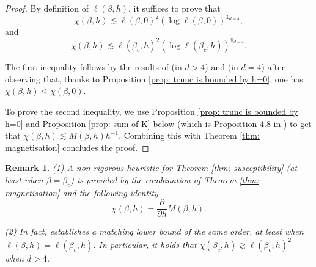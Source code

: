 \documentclass[10pt,a4paper]{amsart}
\numberwithin{equation}{section}
\newtheorem{Rem}[Thm]{Remark}
\begin{document}
\begin{proof} By definition of $\ell(\beta,h)$, it suffices to prove that 
\begin{equation}
\chi(\beta,h)\lesssim \ell(\beta,0)^2(\log \ell(\beta,0))^{\mathds{1}_{d=4}},
\end{equation} and 
\begin{equation}
\chi(\beta,h)\lesssim \ell(\beta_c,h)^2(\log \ell(\beta_c,h))^{\mathds{1}_{d=4}}.
\end{equation} 

The first inequality follows by the results of \cite{AizenmanGeometricAnalysis1982} (in $d>4$) and \cite{AizenmanGrahamRenormalizedCouplingSusceptibility4d1983} (in $d=4$) after observing that, thanks to Proposition \ref{prop: trunc is bounded by h=0}, one has $\chi(\beta,h)\leq \chi(\beta,0)$. 

To prove the second inequality, we use Proposition \ref{prop: trunc is bounded by h=0} and Proposition \ref{prop: sum of K} below (which is Proposition 4.8 in \cite{AizenmanFernandezCriticalBehaviorMagnetization1986}) to get that $\chi(\beta,h)\lesssim M(\beta,h) h^{-1}$. Combining this with Theorem \ref{thm: magnetisation} concludes the proof. 
%
%
%	
\end{proof}


\begin{Rem}\label{rem:suscept lb}\hspace{-1pt}(1) A non-rigorous heuristic for Theorem \ref{thm: susceptibility} (at least when $\beta=\beta_c$) is provided by the combination of Theorem \ref{thm: magnetisation} and the following identity
\begin{equation}
	\chi(\beta,h)=\frac{\partial}{\partial h}M(\beta,h).
\end{equation}

(2) In fact, \cite{AizenmanFernandezCriticalBehaviorMagnetization1986} 
establishes a matching lower bound of the same order, at least when 
$\ell(\beta,h)=\ell(\beta_c,h)$. In particular, it holds that $\chi(\beta_c,h)\gtrsim \ell(\beta_c,h)^2$ when $d>4$.
\end{Rem}
\end{document}
